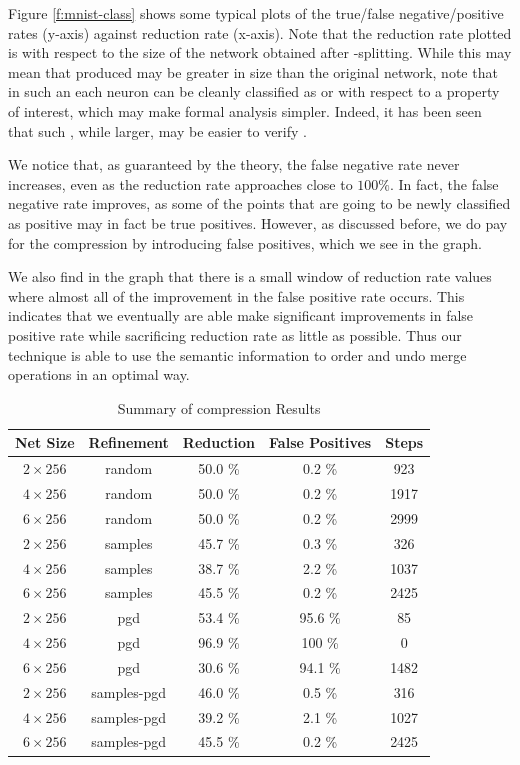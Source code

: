 Figure \ref{f:mnist-class} shows some typical plots of the true/false
negative/positive rates (y-axis) against reduction rate (x-axis). Note that the
reduction rate plotted is with respect to the size of the network obtained after
\inc-\dec splitting. While this may mean that \abs produced may be greater in
size than the original network, note that in such an \abs each neuron can be
cleanly classified as \inc or \dec with respect to a property of interest, which
may make formal analysis simpler. Indeed, it has been seen that such \abs, while
larger, may be easier to verify \cite{cegar-nn}.

We notice that, as guaranteed by the theory, the false negative rate never
increases, even as the reduction rate approaches close to $100\%$. In fact, the
false negative rate improves, as some of the points that are going
to be newly classified as positive may in fact be true positives.  
However, as discussed before, we do pay for the compression by introducing false
positives, which we see in the graph. 

We also find in the graph that there is a
small window of reduction rate values where almost all of the improvement in the
false positive rate occurs. This indicates that we eventually are able make 
significant improvements in false positive rate while sacrificing reduction rate
as little as possible. Thus our technique is able to use the semantic
information to order and undo merge operations in an optimal way.

\begin{table}
\begin{tabular}{|c|c|c|c|c|}
\hline
Net Size     & Refinement  & Reduction & False Positives & Steps  \\ 
\hline
$2\times256$ & random      & 50.0 \%   & 0.2  \%         &  923   \\  
$4\times256$ & random      & 50.0 \%   & 0.2  \%         & 1917    \\ 
$6\times256$ & random      & 50.0 \%   & 0.2  \%         & 2999    \\ 
$2\times256$ & samples     & 45.7 \%   & 0.3  \%         &  326    \\ 
$4\times256$ & samples     & 38.7 \%   & 2.2  \%         & 1037    \\ 
$6\times256$ & samples     & 45.5 \%   & 0.2  \%         & 2425    \\ 
$2\times256$ & pgd         & 53.4 \%   & 95.6 \%         &   85    \\ 
$4\times256$ & pgd         & 96.9 \%   & 100  \%         &    0    \\ 
$6\times256$ & pgd         & 30.6 \%   & 94.1 \%         & 1482    \\ 
$2\times256$ & samples-pgd & 46.0 \%   & 0.5  \%         &  316    \\ 
$4\times256$ & samples-pgd & 39.2 \%   & 2.1  \%         & 1027    \\ 
$6\times256$ & samples-pgd & 45.5 \%   & 0.2  \%         & 2425    \\ 
\hline
\end{tabular}
\caption{Summary of \mnist compression Results}
\label{t:mnist-compr-summary}
\end{table}

